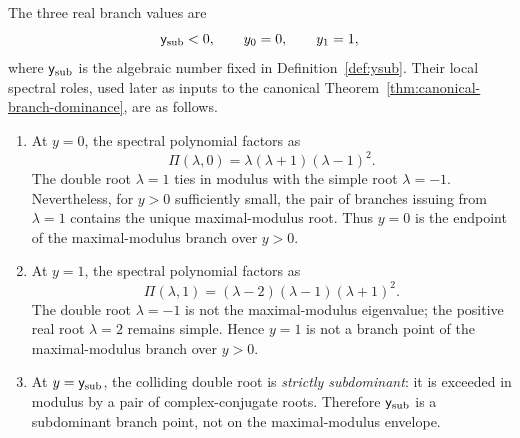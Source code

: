 \begin{proposition}\label{prop:ep-classification}
The three real branch values are
\[
\mathsf{y}_{\mathrm{sub}} < 0, \qquad y_0 = 0, \qquad y_1 = 1,
\]
where \(\mathsf{y}_{\mathrm{sub}}\) is the algebraic number fixed in Definition~\ref{def:ysub}.
Their local spectral roles, used later as inputs to the canonical Theorem~\ref{thm:canonical-branch-dominance}, are as follows.
\begin{enumerate}
\item At $y = 0$, the spectral polynomial factors as
\begin{equation}\label{eq:endpoint-factor-y0}
\Pi(\lambda, 0) = \lambda(\lambda + 1)(\lambda - 1)^2.
\end{equation}
The double root $\lambda=1$ ties in modulus with the simple root $\lambda=-1$.
Nevertheless, for $y>0$ sufficiently small, the pair of branches issuing from $\lambda=1$ contains the unique maximal-modulus root.
Thus $y=0$ is the endpoint of the maximal-modulus branch over $y>0$.

\item At $y = 1$, the spectral polynomial factors as
\begin{equation}\label{eq:endpoint-factor-y1}
\Pi(\lambda, 1) = (\lambda - 2)(\lambda - 1)(\lambda + 1)^2.
\end{equation}
The double root $\lambda = -1$ is not the maximal-modulus eigenvalue; the positive real root $\lambda = 2$ remains simple.
Hence $y = 1$ is not a branch point of the maximal-modulus branch over $y>0$.

\item At \(y=\mathsf{y}_{\mathrm{sub}}\), the colliding double root is \emph{strictly subdominant}: it is exceeded in modulus by a pair of complex-conjugate roots.
Therefore $\mathsf{y}_{\mathrm{sub}}$ is a subdominant branch point, not on the maximal-modulus envelope.
\end{enumerate}
\end{proposition}

